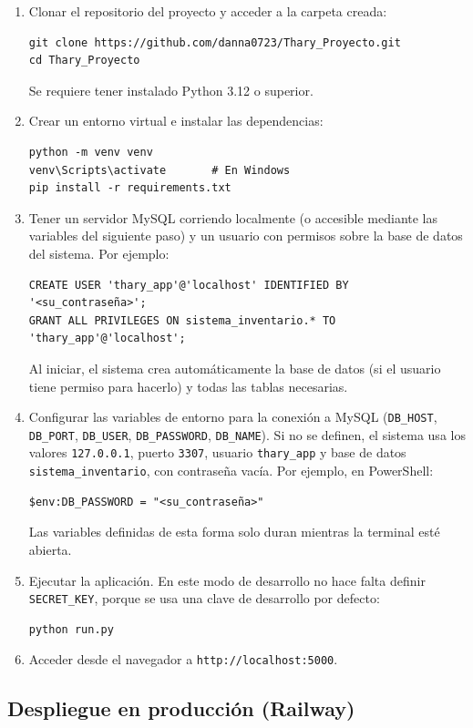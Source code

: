 \begin{enumerate}
    \item Clonar el repositorio del proyecto y acceder a la carpeta creada:
    \begin{verbatim}
git clone https://github.com/danna0723/Thary_Proyecto.git
cd Thary_Proyecto
    \end{verbatim}
    Se requiere tener instalado Python 3.12 o superior.
    \item Crear un entorno virtual e instalar las dependencias:
    \begin{verbatim}
python -m venv venv
venv\Scripts\activate       # En Windows
pip install -r requirements.txt
    \end{verbatim}
    \item Tener un servidor MySQL corriendo localmente (o accesible mediante las variables del siguiente paso) y un usuario con permisos sobre la base de datos del sistema. Por ejemplo:
    \begin{verbatim}
CREATE USER 'thary_app'@'localhost' IDENTIFIED BY '<su_contraseña>';
GRANT ALL PRIVILEGES ON sistema_inventario.* TO 'thary_app'@'localhost';
    \end{verbatim}
    Al iniciar, el sistema crea automáticamente la base de datos (si el usuario tiene permiso para hacerlo) y todas las tablas necesarias.
    \item Configurar las variables de entorno para la conexión a MySQL (\texttt{DB\_HOST}, \texttt{DB\_PORT}, \texttt{DB\_USER}, \texttt{DB\_PASSWORD}, \texttt{DB\_NAME}). Si no se definen, el sistema usa los valores \texttt{127.0.0.1}, puerto \texttt{3307}, usuario \texttt{thary\_app} y base de datos \texttt{sistema\_inventario}, con contraseña vacía. Por ejemplo, en PowerShell:
    \begin{verbatim}
$env:DB_PASSWORD = "<su_contraseña>"
    \end{verbatim}
    Las variables definidas de esta forma solo duran mientras la terminal esté abierta.
    \item Ejecutar la aplicación. En este modo de desarrollo no hace falta definir \texttt{SECRET\_KEY}, porque se usa una clave de desarrollo por defecto:
    \begin{verbatim}
python run.py
    \end{verbatim}
    \item Acceder desde el navegador a \texttt{http://localhost:5000}.
\end{enumerate}

\subsection*{Despliegue en producción (Railway)}

